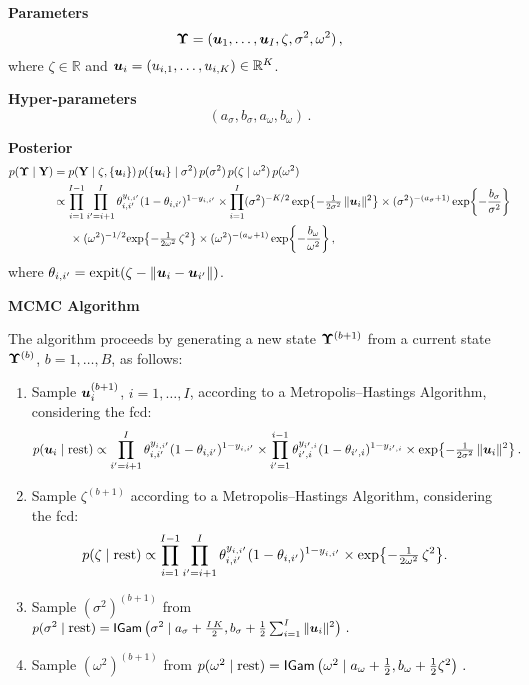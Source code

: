 \documentclass[letterpaper,12pt,openany]{article}
\def\exp#1{{\rm exp}{#1}}
\def\frac#1#2{{{#1}\over{#2}}}
\def\le{\left}
\def\ri{\right}
\DeclareMathOperator*{\expit}{expit}
\newcommand{\ex}[1]{\exp{ \left\{ #1 \right\}}}
\def\IGamd{\small{\mathsf{IGam}}}
\def\rest{\text{rest}}
\def\Y{\mathbf{Y}}\def\y{\mathbf{y}}\def\Yv{\boldsymbol{Y}}\def\yv{\boldsymbol{y}}
\def\si{\sigma}\def\siv{\boldsymbol{\sigma}}
\def\sig{\sigma}\def\sigv{\boldsymbol{\sigma}}
\def\ome{\omega}
\def\reals{\mathbb{R}}
\begin{document}
\textbf{Parameters} 
$$\UPS= (\uv_1,\ldots,\uv_I, \zeta, \sigma^2, \ome^2)\,,$$ where $\zeta\in\reals$ and $\uv_i=(u_{i,1},\ldots,u_{i,K})\in\reals^K$.

\textbf{Hyper-parameters} 
$$(a_{\sig}, b_{\sig}, a_{\ome}, b_{\ome})\,.$$

\textbf{Posterior}
\begin{align*}
p(\UPS\mid\Y) &= p(\Y\mid \zeta, \{\uv_i\})\,p(\{\uv_i\}\mid \sigma^2)\,p(\sigma^2)\,p(\zeta\mid\omega^2)\,p(\omega^2)\\
&\propto\prod_{i=1}^{I-1}\prod_{i'=i+1}^I \theta_{i,i'}^{y_{i,i'}}(1-\theta_{i,i'})^{1-y_{i,i'}} \times
\prod_{i=1}^I (\sig^2)^{-K/2}\,\ex{-\tfrac{1}{2\sig^2}\,\|\uv_i\|^2} \times(\sig^2)^{-(a_\sig+1)}\,\ex{-\frac{b_\sig}{\sig^2}} \\
&\hspace{0.5cm}\times (\ome^2)^{-1/2} \ex{-\tfrac{1}{2\ome^2}\,\zeta^2}  \times (\ome^2)^{-(a_\ome+1)}\,\ex{-\frac{b_\ome}{\ome^2}}\,,
\end{align*}
where $\theta_{i,i'}=\expit(\zeta- \|\uv_i - \uv_{i'}\|)$.

\textbf{MCMC Algorithm} 

The algorithm proceeds by generating a new state $\mathbf{\Upsilon}^{(b+1)}$ from a current state $\mathbf{\Upsilon}^{(b)}$, $b=1,\ldots,B$, as follows:
\begin{enumerate}
	\item Sample $\boldsymbol{u}_i^{(b+1)}$, $i = 1,\ldots,I$, according to a Metropolis--Hastings Algorithm, considering the fcd:
	\begin{align*}
		p(\uv_i\mid\rest)
		&\propto\prod_{i'=i+1}^I \theta_{i,i'}^{y_{i,i'}}(1-\theta_{i,i'})^{1-y_{i,i'}}\times
		\prod_{i'=1}^{i-1} \theta_{i',i}^{y_{i',i}}(1-\theta_{i',i})^{1-y_{i',i}} \times\ex{-\tfrac{1}{2\sig^2}\,\|\uv_i\|^2}\,.
	\end{align*}
	\item Sample $\zeta^{(b+1)}$ according to a Metropolis--Hastings Algorithm, considering the fcd:
	\begin{align*}
	p(\zeta\mid\rest)
	&\propto
	\prod_{i=1}^{I-1}\prod_{i'=i+1}^I \theta_{i,i'}^{y_{i,i'}}(1-\theta_{i,i'})^{1-y_{i,i'}}\times \ex{-\tfrac{1}{2\ome^2}\,\zeta^2}.
	\end{align*}

	\item Sample $(\si^2)^{(b+1)}$ from
	$p(\sig^2\mid\rest) = \IGamd\le(\sig^2 \mid a_\sig + \tfrac{I\,K}2, b_\sig + \tfrac12 \textstyle\sum_{i=1}^I\|\uv_i\|^2 \ri)\,.$
	
	\item Sample $(\ome^2)^{(b+1)}$ from
	$p(\ome^2\mid\rest) = \IGamd\le(\ome^2 \mid a_\omega + \tfrac12, b_\omega + \tfrac12 \zeta^2 \ri)\,.$
\end{enumerate}
\end{document}
